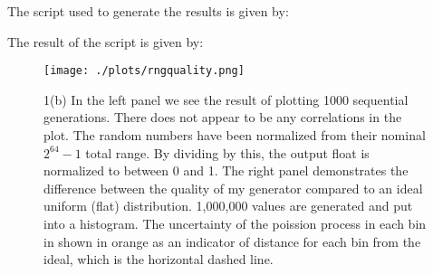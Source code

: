
The script used to generate the results is given by:



The result of the script is given by:




\begin{figure}[h!]
  \centering
  \texttt{[image: ./plots/rngquality.png]}
  \caption{1(b) In the left panel we see the result of plotting 1000 sequential generations. There does not appear to be any correlations in the plot. The random numbers have been normalized from their nominal $2^{64}-1$ total range. By dividing by this, the output float is normalized to between 0 and 1. The right panel demonstrates the difference between the quality of my generator compared to an ideal uniform (flat) distribution. 1,000,000 values are generated and put into a histogram. The uncertainty of the poission process in each bin in shown in orange as an indicator of distance for each bin from the ideal, which is the horizontal dashed line.}
  \label{fig:rngquality}
\end{figure}
